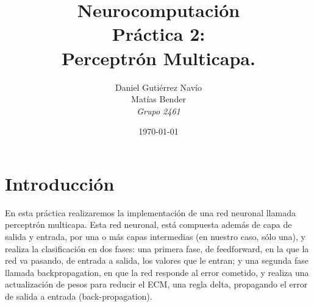 \documentclass[12pt]{article}
\begin{document}
\title{
	{\bf Neurocomputación} \\
	Práctica 2:\\ {\bf Perceptrón Multicapa}.\\
}
\author{
	Daniel Gutiérrez Navío \\
	Matías Bender \\
	\textit{Grupo 2461}
}
\date{\today}

\maketitle

\thispagestyle{empty}
\newpage


\tableofcontents
\newpage


%

\setcounter{page}{1}

\setlength{\parindent}{0pt}

\setlength{\parskip}{8pt}


\newpage
\section*{Introducción}
En esta práctica realizaremos la implementación de una red neuronal llamada perceptrón multicapa.
Esta red neuronal, está compuesta además de capa de salida y entrada, por una o más capas intermedias (en nuestro caso, sólo una), y realiza la clasificación en dos fases: una primera fase, de feedforward, en la que la red va pasando, de entrada a salida, los valores que le entran; y una segunda fase llamada backpropagation, en que la red responde al error cometido, y realiza una actualización de pesos para reducir el ECM, una regla delta, propagando el error de salida a entrada (back-propagation).
\end{document}
